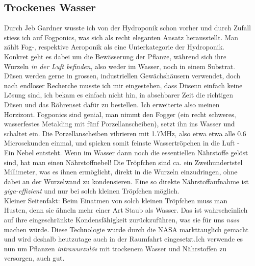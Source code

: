 \documentclass[12pt,titlepage,a4paper]{article}
\begin{document}
\subsection{Trockenes Wasser}
Durch Jeb Gardner wusste ich von der Hydroponik schon vorher und durch Zufall stiess ich auf Fogponics, was sich als recht eleganten Ansatz herausstellt. Man zählt Fog-, respektive Aeroponik als eine Unterkategorie der Hydroponik. Konkret geht es dabei um die Bewässerung der Pflanze, während sich ihre Wurzeln \textit{in der Luft befinden}, also weder im Wasser, noch in einem Substrat. Düsen werden gerne in grossen, industriellen Gewächshäusern verwendet, doch nach endloser Recherche musste ich mir eingestehen, dass Düsenn einfach keine Lösung sind, ich bekam es einfach nicht hin, in absehbarer Zeit die richtigen Düsen und das Röhrenset dafür zu bestellen. Ich erweiterte also meinen Horzizont. Fogponics sind genial, man nimmt den Fogger (ein recht schweres, wasserfestes Metalding mit fünf Porzellanscheiben), setzt ihn ins Wasser und schaltet ein. Die Porzellanscheiben vibrieren mit 1.7MHz, also etwa etwa alle 0.6 Microsekunden einmal, und spicken somit feinste Wassertröpchen in die Luft - Ein Nebel entsteht. Wenn im Wasser dann noch die essentiellen Nährstoffe gelöst sind, hat man einen Nährstoffnebel! Die Tröpfchen sind ca. ein Zweihundertstel Millimeter, was es ihnen ermöglicht, direkt in die Wurzeln einzudringen, ohne dabei an der Wurzelwand zu kondensieren. Eine so direkte Nährstoffaufnahme ist \textit{giga-effizient} und nur bei solch kleinen Tröpfchen möglich.  \\ 
Kleiner Seitenfakt: Beim Einatmen von solch kleinen Tröpfchen muss man Husten, denn sie ähneln mehr einer Art Staub als Wasser. Das ist wahrscheinlich auf ihre eingeschränkte Kondensfähigkeit zurückzuführen, was sie für uns \textit{nass} machen würde. Diese Technologie wurde durch die NASA markttauglich gemacht und wird deshalb heutzutage auch in der Raumfahrt eingesetzt.Ich verwende es nun um Pflanzen \textit{intrawurzulös} mit trockenem Wasser und Nährstoffen zu versorgen, auch gut.



\end{document}
